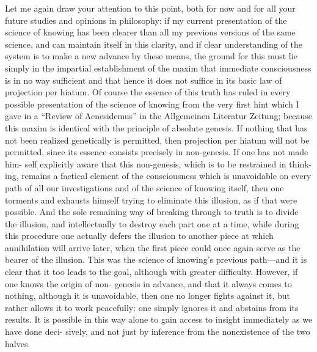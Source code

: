Let me again draw your attention to this point,
both for now and for all your future
studies and opinions in philosophy:
if my current presentation of
the science of knowing has been clearer
than all my previous versions of the same science,
and can maintain itself in this clarity,
and if clear understanding of the system is
to make a new advance by these means,
the ground for this must lie simply
in the impartial establishment of
the maxim that immediate consciousness is
in no way sufficient and that hence
it does not suffice in its basic
law of projection per hiatum.
Of course the essence of this truth has ruled
in every possible presentation of
the science of knowing from the very first hint
which I gave in a “Review of Aenesidemus”
in the Allgemeinen Literatur Zeitung;
because this maxim is identical with
 the principle of absolute genesis.
If nothing that has not been realized
genetically is permitted, then projection per hiatum will not be permitted,
since its essence consists precisely in non-genesis.
If one has not made him-
self explicitly aware that this non-genesis, which is to be restrained in think-
ing, remains a factical element of the consciousness which is unavoidable
on every path of all our investigations and of the science of knowing itself,
then one torments and exhausts himself trying to eliminate this illusion, as
if that were possible.
And the sole remaining way of breaking through to
truth is to divide the illusion, and intellectually to destroy each part one at
a time, while during this procedure one actually defers the illusion to
another piece at which annihilation will arrive later, when the first piece
could once again serve as the bearer of the illusion.
This was the science of
knowing’s previous path—and it is clear that it too leads to the goal,
although with greater difficulty.
However, if one knows the origin of non-
genesis in advance, and that it always comes to nothing, although it is
unavoidable, then one no longer fights against it, but rather allows it to work
peacefully: one simply ignores it and abstains from its results.
It is possible in this way alone to gain access to insight immediately as we have done deci-
sively, and not just by inference from the nonexistence of the two halves.

